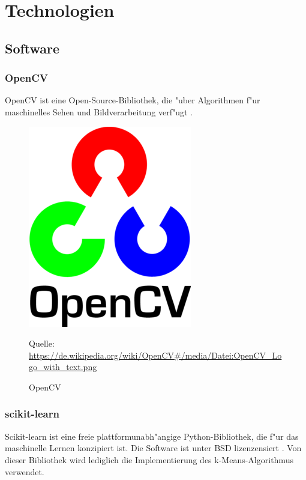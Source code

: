 \chapter{Technologien}
\label{cha:technologien}

\section{Software}
\label{sec:software}

\subsection{OpenCV}
\label{sec:opencv}

OpenCV ist eine Open-Source-Bibliothek, die "uber Algorithmen f"ur maschinelles Sehen und Bildverarbeitung verf"ugt \cite{Ocv}.

\begin{figure}[H]
	\includegraphics[scale=1.0]{bilder/opencv}
	\caption[OpenCV]{OpenCV}
	\cite{Ocv}
	\small Quelle: \url{https://de.wikipedia.org/wiki/OpenCV#/media/Datei:OpenCV_Logo_with_text.png}
\end{figure}

\subsection{scikit-learn}
\label{sec:scikitlearn}

Scikit-learn ist eine freie plattformunabh"angige Python-Bibliothek, die f"ur das maschinelle Lernen konzipiert ist. Die Software ist unter BSD lizenzensiert \cite{ScL}.
Von dieser Bibliothek wird lediglich die Implementierung des k-Means-Algorithmus verwendet.

